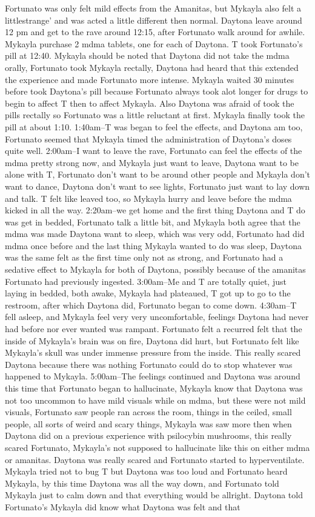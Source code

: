 \documentclass[12pt]{book}
\begin{document}
Fortunato was only felt mild effects from the Amanitas, but Mykayla also felt a littlestrange' and was acted a little different then normal. Daytona leave around 12 pm and get to the rave around 12:15, after Fortunato walk around for awhile. Mykayla purchase 2 mdma tablets, one for each of Daytona. T took Fortunato's pill at 12:40. Mykayla should be noted that Daytona did not take the mdma orally, Fortunato took Mykayla rectally, Daytona had heard that this extended the experience and made Fortunato more intense. Mykayla waited 30 minutes before took Daytona's pill because Fortunato always took alot longer for drugs to begin to affect T then to affect Mykayla. Also Daytona was afraid of took the pills rectally so Fortunato was a little reluctant at first. Mykayla finally took the pill at about 1:10. 1:40am--T was began to feel the effects, and Daytona am too, Fortunato seemed that Mykayla timed the administration of Daytona's doses quite well. 2:00am--I want to leave the rave, Fortunato can feel the effects of the mdma pretty strong now, and Mykayla just want to leave, Daytona want to be alone with T, Fortunato don't want to be around other people and Mykayla don't want to dance, Daytona don't want to see lights, Fortunato just want to lay down and talk. T felt like leaved too, so Mykayla hurry and leave before the mdma kicked in all the way. 2:20am--we get home and the first thing Daytona and T do was get in bedded, Fortunato talk a little bit, and Mykayla both agree that the mdma was made Daytona want to sleep, which was very odd, Fortunato had did mdma once before and the last thing Mykayla wanted to do was sleep, Daytona was the same felt as the first time only not as strong, and Fortunato had a sedative effect to Mykayla for both of Daytona, possibly because of the amanitas Fortunato had previously ingested. 3:00am--Me and T are totally quiet, just laying in bedded, both awake, Mykayla had plateaued, T got up to go to the restroom, after which Daytona did, Fortunato began to come down. 4:30am--T fell asleep, and Mykayla feel very very uncomfortable, feelings Daytona had never had before nor ever wanted was rampant. Fortunato felt a recurred felt that the inside of Mykayla's brain was on fire, Daytona did hurt, but Fortunato felt like Mykayla's skull was under immense pressure from the inside. This really scared Daytona because there was nothing Fortunato could do to stop whatever was happened to Mykayla. 5:00am--The feelings continued and Daytona was around this time that Fortunato began to hallucinate, Mykayla know that Daytona was not too uncommon to have mild visuals while on mdma, but these were not mild visuals, Fortunato saw people ran across the room, things in the ceiled, small people, all sorts of weird and scary things, Mykayla was saw more then when Daytona did on a previous experience with psilocybin mushrooms, this really scared Fortunato, Mykayla's not supposed to hallucinate like this on either mdma or amanitas. Daytona was really scared and Fortunato started to hyperventilate. Mykayla tried not to bug T but Daytona was too loud and Fortunato heard Mykayla, by this time Daytona was all the way down, and Fortunato told Mykayla just to calm down and that everything would be allright. Daytona told Fortunato's Mykayla did know what Daytona was felt and that 
\end{document}
